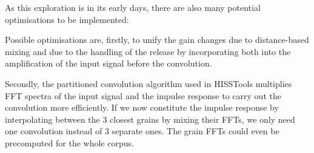 As this exploration is in its early days, there are also many potential optimisations to be implemented:

Possible optimisations are, firstly, to unify the gain changes due to distance-based mixing and due to the handling of the release by incorporating both into the amplification of the input signal before the convolution.

Secondly, the partitioned convolution algorithm used in HISSTools multiplies FFT spectra of the input signal and the impulse response to carry out the convolution more efficiently.  If we now constitute the impulse response by interpolating between the 3 closest grains by mixing their FFTs, we only need one convolution instead of 3 separate ones.  The grain FFTs could even be precomputed for the whole corpus. %